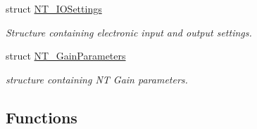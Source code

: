 \begin{DoxyCompactItemize}
struct \hyperlink{struct_n_t___i_o_settings}{N\+T\+\_\+\+I\+O\+Settings}
\begin{DoxyCompactList}\small\item\em Structure containing electronic input and output settings. \end{DoxyCompactList}\item 
struct \hyperlink{struct_n_t___gain_parameters}{N\+T\+\_\+\+Gain\+Parameters}
\begin{DoxyCompactList}\small\item\em structure containing NT Gain parameters. \end{DoxyCompactList}\end{DoxyCompactItemize}
\subsection*{Functions}
